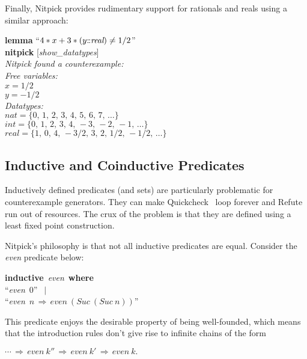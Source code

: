 \documentclass[a4paper,12pt]{article}
\def\Colon{\mathord{:\mkern-1.5mu:}}
\def\unr{\ldots}
\begin{document}
Finally, Nitpick provides rudimentary support for rationals and reals using a
similar approach:

\prew
\textbf{lemma} ``$4 * x + 3 * (y\Colon\textit{real}) \not= 1/2$'' \\
\textbf{nitpick} [\textit{show\_datatypes}] \\[2\smallskipamount]
\slshape Nitpick found a counterexample: \\[2\smallskipamount]
\hbox{}\qquad Free variables: \nopagebreak \\
\hbox{}\qquad\qquad $x = 1/2$ \\
\hbox{}\qquad\qquad $y = -1/2$ \\
\hbox{}\qquad Datatypes: \\
\hbox{}\qquad\qquad $\textit{nat} = \{0,\, 1,\, 2,\, 3,\, 4,\, 5,\, 6,\, 7,\, \unr\}$ \\
\hbox{}\qquad\qquad $\textit{int} = \{0,\, 1,\, 2,\, 3,\, 4,\, -3,\, -2,\, -1,\, \unr\}$ \\
\hbox{}\qquad\qquad $\textit{real} = \{1,\, 0,\, 4,\, -3/2,\, 3,\, 2,\, 1/2,\, -1/2,\, \unr\}$
\postw

\subsection{Inductive and Coinductive Predicates}
\label{inductive-and-coinductive-predicates}

Inductively defined predicates (and sets) are particularly problematic for
counterexample generators. They can make Quickcheck~\cite{berghofer-nipkow-2004}
loop forever and Refute~\cite{weber-2008} run out of resources. The crux of
the problem is that they are defined using a least fixed point construction.

Nitpick's philosophy is that not all inductive predicates are equal. Consider
the \textit{even} predicate below:

\prew
\textbf{inductive}~\textit{even}~\textbf{where} \\
``\textit{even}~0'' $\,\mid$ \\
``\textit{even}~$n\,\Longrightarrow\, \textit{even}~(\textit{Suc}~(\textit{Suc}~n))$''
\postw

This predicate enjoys the desirable property of being well-founded, which means
that the introduction rules don't give rise to infinite chains of the form

\prew
$\cdots\,\Longrightarrow\, \textit{even}~k''
       \,\Longrightarrow\, \textit{even}~k'
       \,\Longrightarrow\, \textit{even}~k.$
\postw
\end{document}
